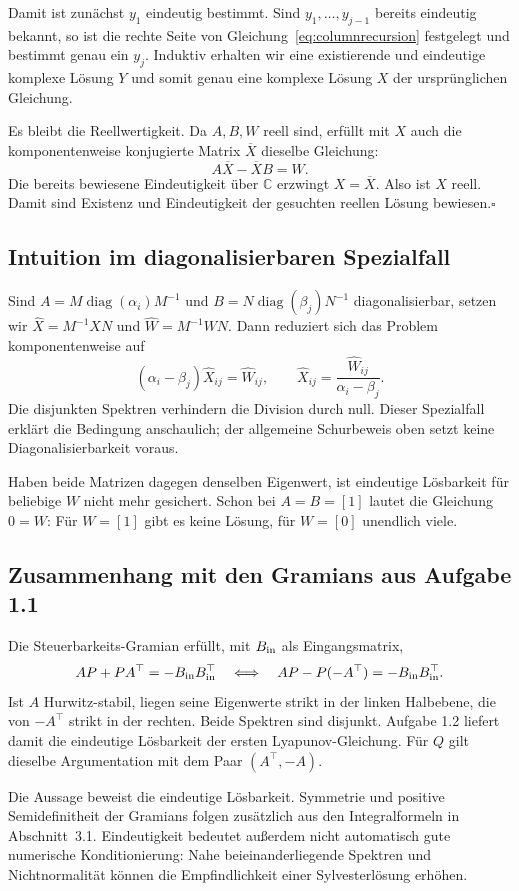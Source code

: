 Damit ist zunächst $y_1$ eindeutig bestimmt. Sind $y_1,\ldots,y_{j-1}$ bereits eindeutig bekannt, so ist die rechte Seite von Gleichung~\eqref{eq:columnrecursion} festgelegt und bestimmt genau ein $y_j$. Induktiv erhalten wir eine existierende und eindeutige komplexe Lösung $Y$ und somit genau eine komplexe Lösung $X$ der ursprünglichen Gleichung.

Es bleibt die Reellwertigkeit. Da $A,B,W$ reell sind, erfüllt mit $X$ auch die komponentenweise konjugierte Matrix $\overline X$ dieselbe Gleichung:
\begin{equation}
 A\overline X-\overline X B=W.
\end{equation}
Die bereits bewiesene Eindeutigkeit über $\mathbb C$ erzwingt $X=\overline X$. Also ist $X$ reell. Damit sind Existenz und Eindeutigkeit der gesuchten reellen Lösung bewiesen.\hfill$\square$

\subsection{Intuition im diagonalisierbaren Spezialfall}
Sind $A=M\operatorname{diag}(\alpha_i)M^{-1}$ und $B=N\operatorname{diag}(\beta_j)N^{-1}$ diagonalisierbar, setzen wir $\widehat X=M^{-1}XN$ und $\widehat W=M^{-1}WN$. Dann reduziert sich das Problem komponentenweise auf
\begin{equation}
 (\alpha_i-\beta_j)\widehat X_{ij}=\widehat W_{ij},\qquad
 \widehat X_{ij}=\frac{\widehat W_{ij}}{\alpha_i-\beta_j}.
\end{equation}
Die disjunkten Spektren verhindern die Division durch null. Dieser Spezialfall erklärt die Bedingung anschaulich; der allgemeine Schurbeweis oben setzt keine Diagonalisierbarkeit voraus.

Haben beide Matrizen dagegen denselben Eigenwert, ist eindeutige Lösbarkeit für beliebige $W$ nicht mehr gesichert. Schon bei $A=B=[1]$ lautet die Gleichung $0=W$: Für $W=[1]$ gibt es keine Lösung, für $W=[0]$ unendlich viele.

\subsection{Zusammenhang mit den Gramians aus Aufgabe 1.1}
Die Steuerbarkeits-Gramian erfüllt, mit $B_{\rm in}$ als Eingangsmatrix,
\begin{equation}
 AP+PA^\top=-B_{\rm in}B_{\rm in}^\top
 \quad\Longleftrightarrow\quad
 AP-P(-A^\top)=-B_{\rm in}B_{\rm in}^\top.
\end{equation}
Ist $A$ Hurwitz-stabil, liegen seine Eigenwerte strikt in der linken Halbebene, die von $-A^\top$ strikt in der rechten. Beide Spektren sind disjunkt. Aufgabe 1.2 liefert damit die eindeutige Lösbarkeit der ersten Lyapunov-Gleichung. Für $Q$ gilt dieselbe Argumentation mit dem Paar $(A^\top,-A)$.

Die Aussage beweist die eindeutige Lösbarkeit. Symmetrie und positive Semidefinitheit der Gramians folgen zusätzlich aus den Integralformeln in Abschnitt~3.1. Eindeutigkeit bedeutet außerdem nicht automatisch gute numerische Konditionierung: Nahe beieinanderliegende Spektren und Nichtnormalität können die Empfindlichkeit einer Sylvesterlösung erhöhen.
